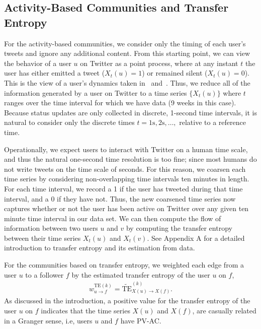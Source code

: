 \subsection{Activity-Based Communities and Transfer Entropy}
\label{sec:method-activity}

For the activity-based communities, we consider only the timing of each user's tweets and ignore any additional content. From this starting point, we can view the behavior of a user $u$ on Twitter as a point process, where at any instant $t$ the user has either emitted a tweet ($X_{t}(u) = 1$) or remained silent ($X_{t}(u) = 0$). This is the view of a user's dynamics taken in~\cite{darmon2013understanding} and~\cite{ver2012information}. Thus, we reduce all of the information generated by a user on Twitter to a time series $\{ X_{t}(u)\}$ where $t$ ranges over the time interval for which we have data (9 weeks in this case). Because status updates are only collected in discrete, 1-second time intervals, it is natural to consider only the discrete times $t = 1 \text{s}, 2 \text{s}, \ldots, $ relative to a reference time. 

Operationally, we expect users to interact with Twitter on a human time scale, and thus the natural one-second time resolution is too fine; since most humans do not write tweets on the time scale of seconds. For this reason, we coarsen each time series by considering non-overlapping time intervals ten minutes in length. For each time interval, we record a 1 if the user has tweeted during that time interval, and a 0 if they have not. Thus, the new coarsened time series now captures whether or not the user has been active on Twitter over any given ten minute time interval in our data set. We can then compute the flow of information between two users $u$ and $v$ by computing the transfer entropy between their time series $X_{t}(u)$ and $X_{t}(v).$ See Appendix A for a detailed introduction to transfer entropy and its estimation from data.



For the communities based on transfer entropy, we weighted each edge from a user $u$ to a follower $f$ by the estimated transfer entropy of the user $u$ on $f$, 
\begin{align}
	w_{u \to f}^{\text{TE}(k)} = \widetilde{\text{TE}}_{X(u) \to X(f)}^{(k)}. \label{Eqn-EW-activity}
\end{align}
As discussed in the introduction, a positive value for the transfer entropy of the user $u$ on $f$ indicates that the time series $X(u)$ and $X(f)$, are casually related in a Granger sense, i.e, users $u$ and $f$ have PV-AC. 

